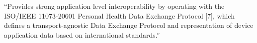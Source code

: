 ``Provides strong application level interoperability by operating with the ISO/IEEE 11073-20601 Personal Health Data Exchange Protocol [7], which defines a transport-agnostic Data Exchange Protocol and representation of device application data based on international standards.''





